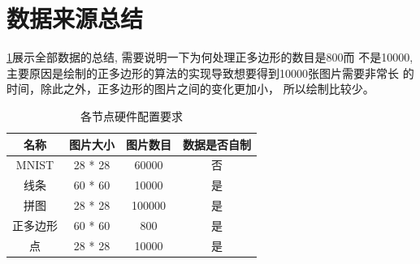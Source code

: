 \section{数据来源总结}
\ref{data_table_1}展示全部数据的总结, 需要说明一下为何处理正多边形的数目是800而
不是10000, 主要原因是绘制的正多边形的算法的实现导致想要得到10000张图片需要非常长
的时间，除此之外，正多边形的图片之间的变化更加小， 所以绘制比较少。
\begin{table}[htb]
\centering
\label{data_table_1}
\begin{tabular}{c|c|c|c}
\hline\hline

\textbf{名称} & \textbf{图片大小} & \textbf{图片数目} & \textbf{数据是否自制} \\
\hline\hline

MNIST    & 28 * 28 & 60000  & 否\\
\hline

线条     & 60 * 60 & 10000  & 是 \\
\hline

拼图     & 28 * 28 & 100000 & 是 \\
\hline

正多边形 & 60 * 60 & 800    & 是\\
\hline

点       & 28 * 28 & 10000  & 是 \\
\hline

\hline\hline
\end{tabular}
\caption{各节点硬件配置要求}
\end{table}

